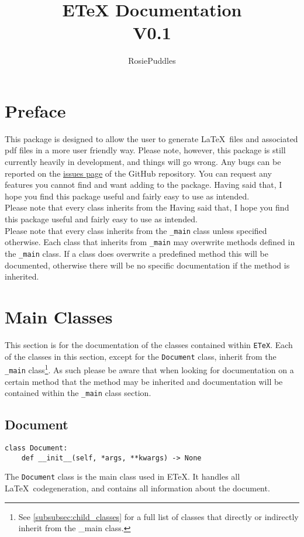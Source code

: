 \documentclass{article}
\title{ETeX Documentation\\\large V0.1}
\date{}
\author{RosiePuddles}
\begin{document}
\maketitle
\tableofcontents
\newpage

\section{Preface}\label{sec:preface}
This package is designed to allow the user to generate \LaTeX\ files and associated pdf files in a more user friendly way. Please note, however, this package is still currently heavily in development, and things will go wrong. Any bugs can be reported on the \href{https://github.com/RosiePuddles/ETeX\_from\_python/issues}{issues page} of the GitHub repository. You can request any features you cannot find and want adding to the package. Having said that, I hope you find this package useful and fairly easy to use as intended.\\
Please note that every class inherits from the  Having said that, I hope you find this package useful and fairly easy to use as intended.\\
Please note that every class inherits from the \verb|_main| class unless specified otherwise. Each class that inherits from \verb|_main| may overwrite methods defined in the \verb|_main| class. If a class does overwrite a predefined method this will be documented, otherwise there will be no specific documentation if the method is inherited.
\section{Main Classes}\label{sec:main_classes}
This section is for the documentation of the classes contained within \verb|ETeX|. Each of the classes in this section, except for the \verb|Document| class, inherit from the \verb|_main| class\footnote{See \autoref{subsubsec:child_classes} for a full list of classes that directly or indirectly inherit from the \_main class.}. As such please be aware that when looking for documentation on a certain method that the method may be inherited and documentation will be contained within the \verb|_main| class section.
\subsection{Document}\label{subsec:document}
\begin{verbatim}
class Document:
	def __init__(self, *args, **kwargs) -> None
\end{verbatim}
The \verb|Document| class is the main class used in ETeX. It handles all \LaTeX\ codegeneration, and contains all information about the document.
\end{document}
